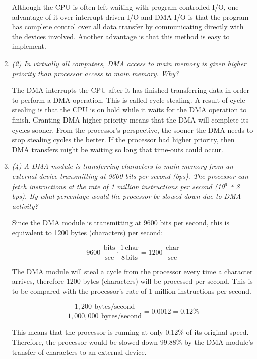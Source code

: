 \documentclass[letterpaper,11pt]{article}
\newcommand{\superscript}[1]{\ensuremath{^{\textrm{#1}}}}
\newcommand{\unit}[1]{\ensuremath{\, \mathrm{#1}}}
\begin{document}
\begin{enumerate}
  Although the CPU is often left waiting with program-controlled I/O, one advantage of it over interrupt-driven I/O and DMA I/O is that the program has complete control over all data transfer by communicating directly with the devices involved.  Another advantage is that this method is easy to implement.
  \item \emph{(2) In virtually all computers, DMA access to main memory is given higher priority than processor access to main memory. Why?}

  The DMA interrupts the CPU after it has finished transferring data in order to perform a DMA operation.  This is called cycle stealing.  A result of cycle stealing is that the CPU is on hold while it waits for the DMA operation to finish.  Granting DMA higher priority means that the DMA will complete its cycles sooner.  From the processor's perspective, the sooner the DMA needs to stop stealing cycles the better.  If the processor had higher priority, then DMA transfers might be waiting so long that time-outs could occur.
  \item \emph{(4) A DMA module is transferring characters to main memory from an external device transmitting at 9600 bits per second (bps). The processor can fetch instructions at the rate of 1 million instructions per second (10\superscript{6} * 8 bps). By what percentage would the processor be slowed down due to DMA activity?}

   Since the DMA module is transmitting at 9600 bits per second, this is equivalent to 1200 bytes (characters) per second:

  \begin{equation}9600\ \frac{\unit{bits}}{\unit{sec}} \cdot \frac{1 \unit{char}}{8 \unit{bits}} = 1200\ \frac{\unit{char}}{\unit{sec}} \end{equation}

   The DMA module will steal a cycle from the processor every time a character arrives, therefore 1200 bytes (characters) will be processed per second.  This is to be compared with the processor's rate of 1 million instructions per second.

\begin{equation} \frac{1,200\ \unit{bytes/second}}{1,000,000\ \unit{bytes/second}} = 0.0012 = 0.12\% \end{equation}

  This means that the processor is running at only 0.12\% of its original speed.  Therefore, the processor would be slowed down 99.88\% by the DMA module's transfer of characters to an external device.


\end{enumerate}
\end{document}
